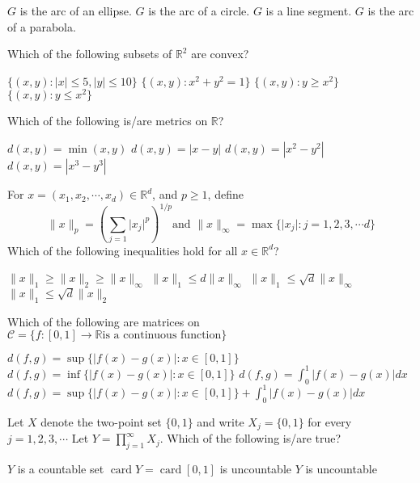 \documentclass[10pt]{exam}
\DeclareMathOperator{\card}{\text{card}}
\newcommand{\R}{\ensuremath{\mathbb{R}}}
\begin{document}
\begin{questions}
\begin{choices}
\choice $G$ is the arc of an ellipse.
\choice $G$ is the arc of a circle.
\choice $G$ is a line segment.
\choice $G$ is the arc of a parabola.
\end{choices} 


\question
Which of the following subsets of $\mathbb{R}^2$ are convex?

\begin{checkboxes}
\choice $\{(x,y):|x| \leq 5, |y| \leq 10 \}$
\choice $\{(x,y): x^2+y^2=1 \}$
\choice $\{(x,y): y \geq x^2 \}$
\choice $\{(x,y): y \leq x^2 \}$
\end{checkboxes}

\question
Which of the following is/are metrics on $\R$?

\begin{checkboxes}
\choice $d(x,y)= \min(x,y)$
\choice $d(x,y)= |x-y|$
\choice $d(x,y)= |x^2-y^2|$
\choice $d(x,y)= |x^3-y^3|$
\end{checkboxes}


\question
For $x=(x_1,x_2, \cdots , x_d) \in \R^d$, and $p \geq 1$, define
$$\|x\|_p= \left( \sum_{j=1} \vert x_j\vert^p \right)^{1/p} \text{and    } \|x\|_{\infty}=\max \{\vert x_j \vert:j=1,2,3,\cdots d \}$$
Which of the following inequalities hold for all $x\in \R^d$?

\begin{checkboxes}
\choice $\|x\|_1 \geq \|x\|_2 \geq \|x\|_{\infty}$
\choice $\|x\|_1 \leq d \|x\|_{\infty}$
\choice $\|x\|_1 \leq \sqrt{d} \|x\|_{\infty}$
\choice $\|x\|_1 \leq \sqrt{d} \|x\|_2$
\end{checkboxes}

\question
Which of the following are matrices on $\mathcal{C}=\{f:[0,1] \rightarrow \R \text{is a continuous function}\}$

\begin{checkboxes}
\choice $d(f,g)= \sup\{|f(x)-g(x)|:x \in [0,1]\}$
\choice $d(f,g)= \inf\{|f(x)-g(x)|:x \in [0,1]\}$
\choice $d(f,g)=\int_0^1|f(x)-g(x)|dx $
\choice $d(f,g)=\sup\{|f(x)-g(x)|:x \in [0,1]\} + \int_0^1|f(x)-g(x)|dx$
\end{checkboxes}

\question
Let $X$ denote the two-point set $\{0, 1\}$ and write  $X_j\!\!=\!\!\{0, 1 \}$ for every $j= 1, 2, 3, \cdots $ Let $Y= \prod_{j=1}^{\infty} X_j$.  Which of the following is/are true? 

\begin{checkboxes}
\choice $Y$ is a countable set 
\choice $\card Y= \card [0, 1] $
\choice is uncountable 
\choice $Y$ is uncountable
\end{checkboxes}


\end{questions}
\end{document}
